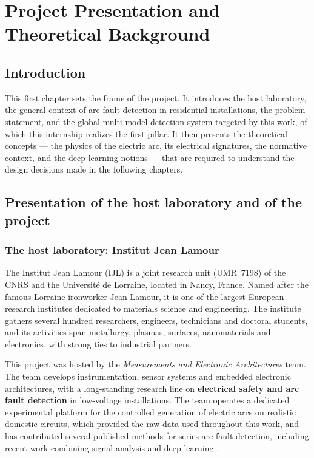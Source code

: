 \chapter{Project Presentation and Theoretical Background}
\label{chap:presentation}

\section*{Introduction}

This first chapter sets the frame of the project. It introduces the host laboratory, the general context of arc fault detection in residential installations, the problem statement, and the global multi-model detection system targeted by this work, of which this internship realizes the first pillar. It then presents the theoretical concepts --- the physics of the electric arc, its electrical signatures, the normative context, and the deep learning notions --- that are required to understand the design decisions made in the following chapters.

\section{Presentation of the host laboratory and of the project}

\subsection{The host laboratory: Institut Jean Lamour}

The Institut Jean Lamour (IJL) is a joint research unit (UMR~7198) of the CNRS and the Université de Lorraine, located in Nancy, France. Named after the famous Lorraine ironworker Jean Lamour, it is one of the largest European research institutes dedicated to materials science and engineering. The institute gathers several hundred researchers, engineers, technicians and doctoral students, and its activities span metallurgy, plasmas, surfaces, nanomaterials and electronics, with strong ties to industrial partners.

\medskip

This project was hosted by the \emph{Measurements and Electronic Architectures} team. The team develops instrumentation, sensor systems and embedded electronic architectures, with a long-standing research line on \textbf{electrical safety and arc fault detection} in low-voltage installations. The team operates a dedicated experimental platform for the controlled generation of electric arcs on realistic domestic circuits, which provided the raw data used throughout this work, and has contributed several published methods for series arc fault detection, including recent work combining signal analysis and deep learning \cite{su2026cumulants}.

